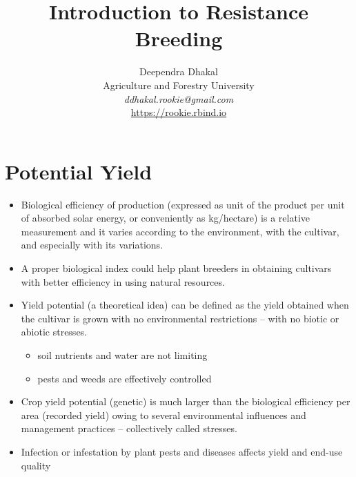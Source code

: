 \documentclass[11pt,dvipsnames,ignorenonframetext,aspectratio=169]{beamer}
\title[]{Introduction to Resistance Breeding}
\author[
        \vspace{-0.5cm}Deependra Dhakal\\
Agriculture and Forestry University\\
\textit{ddhakal.rookie@gmail.com}\\
\url{https://rookie.rbind.io}
    ]{\vspace{-0.5cm}Deependra Dhakal\\
Agriculture and Forestry University\\
\textit{ddhakal.rookie@gmail.com}\\
\url{https://rookie.rbind.io}}
\date[
      
  ]{
    }
\providecommand{\tightlist}{%
  \setlength{\itemsep}{0pt}\setlength{\parskip}{0pt}}
\begin{document}
  \begin{frame}[plain]
  \titlepage
  \end{frame}



\hypertarget{potential-yield}{%
\section{Potential Yield}\label{potential-yield}}

\begin{frame}{}
\protect\hypertarget{section}{}
\small

\begin{itemize}
\tightlist
\item
  Biological efficiency of production (expressed as unit of the product
  per unit of absorbed solar energy, or conveniently as kg/hectare) is a
  relative measurement and it varies according to the environment, with
  the cultivar, and especially with its variations.
\item
  A proper biological index could help plant breeders in obtaining
  cultivars with better efficiency in using natural resources.
\item
  Yield potential (a theoretical idea) can be defined as the yield
  obtained when the cultivar is grown with no environmental restrictions
  -- with no biotic or abiotic stresses.

  \begin{itemize}
  \tightlist
  \item
    soil nutrients and water are not limiting
  \item
    pests and weeds are effectively controlled
  \end{itemize}
\item
  Crop yield potential (genetic) is much larger than the biological
  efficiency per area (recorded yield) owing to several environmental
  influences and management practices -- collectively called
  \alert{stresses}.
\item
  Infection or infestation by plant pests and diseases affects
  \alert{yield} and \alert{end-use quality}
\end{itemize}
\end{frame}
\end{document}
